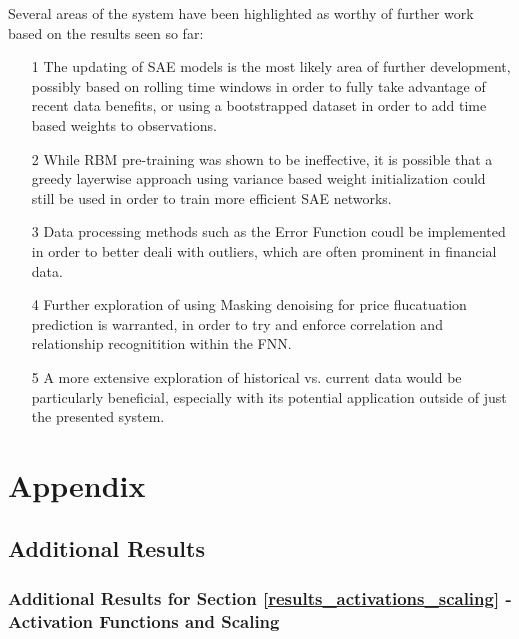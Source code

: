 \documentclass[a4paper,11pt,oneside]{article}
\theoremstyle{plain}
\theoremstyle{definition}
\begin{document}
	Several areas of the system have been highlighted as worthy of further work based on the results seen so far: 
	\begin{itemize}
		\item [1] The updating of SAE models is the most likely area of further development, possibly based on rolling time windows in order to fully take advantage of recent data benefits, or using a bootstrapped dataset in order to add time based weights to observations.
		\item [2] While RBM pre-training was shown to be ineffective, it is possible that a greedy layerwise approach using variance based weight initialization could still be used in order to train more efficient SAE networks.
		\item [3] Data processing methods such as the Error Function coudl be implemented in order to better deali with outliers, which are often prominent in financial data.
		\item [4] Further exploration of using Masking denoising for price flucatuation prediction is warranted, in order to try and enforce correlation and relationship recognitition within the FNN.
		\item [5] A more extensive exploration of historical vs. current data would be particularly beneficial, especially with its potential application outside of just the presented system.
	\end{itemize}
	
	\newpage
	\section{Appendix}\label{Appendix}
	
	\subsection{Additional Results}
	
	\subsubsection{Additional Results for Section \ref{results_activations_scaling} - Activation Functions and Scaling }\label{results_activations_appendix}
	
\end{document}
